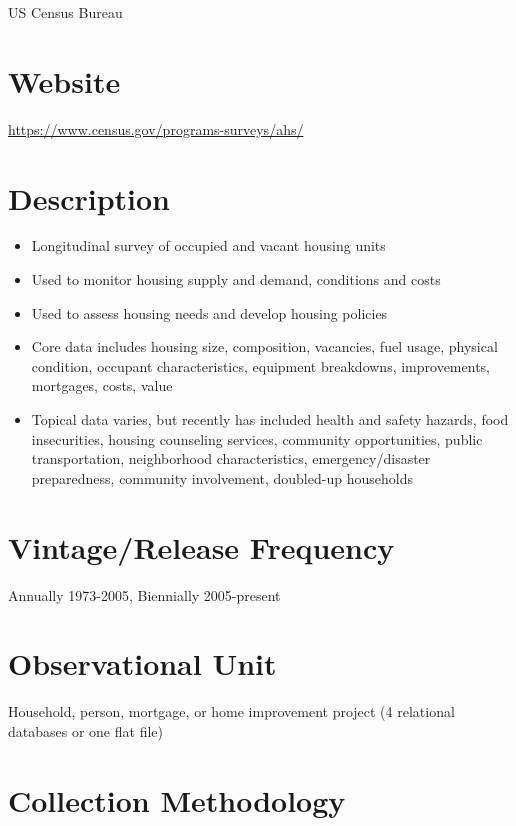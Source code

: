 \documentclass[
]{book}
\providecommand{\tightlist}{%
  \setlength{\itemsep}{0pt}\setlength{\parskip}{0pt}}
\begin{document}
US Census Bureau

\hypertarget{website-6}{%
\section{Website}\label{website-6}}

\url{https://www.census.gov/programs-surveys/ahs/}

\hypertarget{description-6}{%
\section{Description}\label{description-6}}

\begin{itemize}
\tightlist
\item
  Longitudinal survey of occupied and vacant housing units
\item
  Used to monitor housing supply and demand, conditions and costs
\item
  Used to assess housing needs and develop housing policies
\item
  Core data includes housing size, composition, vacancies, fuel usage, physical condition, occupant characteristics, equipment breakdowns, improvements, mortgages, costs, value
\item
  Topical data varies, but recently has included health and safety hazards, food insecurities, housing counseling services, community opportunities, public transportation, neighborhood characteristics, emergency/disaster preparedness, community involvement, doubled-up households
\end{itemize}

\hypertarget{vintagerelease-frequency-6}{%
\section{Vintage/Release Frequency}\label{vintagerelease-frequency-6}}

Annually 1973-2005, Biennially 2005-present

\hypertarget{observational-unit-6}{%
\section{Observational Unit}\label{observational-unit-6}}

Household, person, mortgage, or home improvement project (4 relational databases or one flat file)

\hypertarget{collection-methodology-6}{%
\section{Collection Methodology}\label{collection-methodology-6}}
\end{document}
